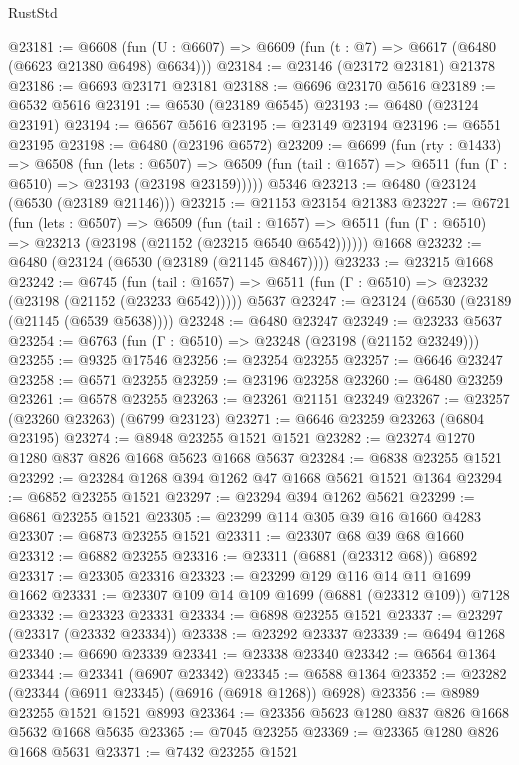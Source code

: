\begin{lexlean}{RustStd}
\begin{coremodule}
@23181 := @6608
    (fun (U : @6607) => @6609 (fun (t : @7) => @6617 (@6480 (@6623 @21380 @6498) @6634)))
@23184 := @23146 (@23172 @23181) @21378
@23186 := @6693 @23171 @23181
@23188 := @6696 @23170 @5616
@23189 := @6532 @5616
@23191 := @6530 (@23189 @6545)
@23193 := @6480 (@23124 @23191)
@23194 := @6567 @5616
@23195 := @23149 @23194
@23196 := @6551 @23195
@23198 := @6480 (@23196 @6572)
@23209 := @6699
    (fun (rty : @1433) =>
    @6508
      (fun (lets : @6507) =>
      @6509 (fun (tail : @1657) => @6511 (fun (Γ : @6510) => @23193 (@23198 @23159)))))
    @5346
@23213 := @6480 (@23124 (@6530 (@23189 @21146)))
@23215 := @21153 @23154 @21383
@23227 := @6721
    (fun (lets : @6507) =>
    @6509
      (fun (tail : @1657) =>
      @6511 (fun (Γ : @6510) => @23213 (@23198 (@21152 (@23215 @6540 @6542))))))
    @1668
@23232 := @6480 (@23124 (@6530 (@23189 (@21145 @8467))))
@23233 := @23215 @1668
@23242 := @6745
    (fun (tail : @1657) => @6511 (fun (Γ : @6510) => @23232 (@23198 (@21152 (@23233 @6542)))))
    @5637
@23247 := @23124 (@6530 (@23189 (@21145 (@6539 @5638))))
@23248 := @6480 @23247
@23249 := @23233 @5637
@23254 := @6763 (fun (Γ : @6510) => @23248 (@23198 (@21152 @23249)))
@23255 := @9325 @17546
@23256 := @23254 @23255
@23257 := @6646 @23247
@23258 := @6571 @23255
@23259 := @23196 @23258
@23260 := @6480 @23259
@23261 := @6578 @23255
@23263 := @23261 @21151 @23249
@23267 := @23257 (@23260 @23263) (@6799 @23123)
@23271 := @6646 @23259 @23263 (@6804 @23195)
@23274 := @8948 @23255 @1521 @1521
@23282 := @23274 @1270 @1280 @837 @826 @1668 @5623 @1668 @5637
@23284 := @6838 @23255 @1521
@23292 := @23284 @1268 @394 @1262 @47 @1668 @5621 @1521 @1364
@23294 := @6852 @23255 @1521
@23297 := @23294 @394 @1262 @5621
@23299 := @6861 @23255 @1521
@23305 := @23299 @114 @305 @39 @16 @1660 @4283
@23307 := @6873 @23255 @1521
@23311 := @23307 @68 @39 @68 @1660
@23312 := @6882 @23255
@23316 := @23311 (@6881 (@23312 @68)) @6892
@23317 := @23305 @23316
@23323 := @23299 @129 @116 @14 @11 @1699 @1662
@23331 := @23307 @109 @14 @109 @1699 (@6881 (@23312 @109)) @7128
@23332 := @23323 @23331
@23334 := @6898 @23255 @1521
@23337 := @23297 (@23317 (@23332 @23334))
@23338 := @23292 @23337
@23339 := @6494 @1268
@23340 := @6690 @23339
@23341 := @23338 @23340
@23342 := @6564 @1364
@23344 := @23341 (@6907 @23342)
@23345 := @6588 @1364
@23352 := @23282 (@23344 (@6911 @23345) (@6916 (@6918 @1268)) @6928)
@23356 := @8989 @23255 @1521 @1521 @8993
@23364 := @23356 @5623 @1280 @837 @826 @1668 @5632 @1668 @5635
@23365 := @7045 @23255
@23369 := @23365 @1280 @826 @1668 @5631
@23371 := @7432 @23255 @1521

\end{coremodule}
\end{lexlean}
